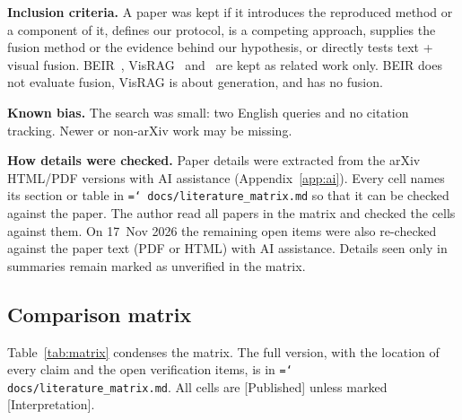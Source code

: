 \documentclass[11pt,a4paper]{article}
\newcommand{\lbl}[2]{\textsf{\scriptsize\textcolor{#1}{[#2]}}}
\newcommand{\Pub}{\lbl{tagP}{Published}}
\newcommand{\Int}{\lbl{tagI}{Interpretation}}
\newcommand{\file}[1]{\texttt{\small\hyphenchar\font=`\/ #1}}
\begin{document}
\noindent\textbf{Inclusion criteria.} A paper was kept if it introduces the reproduced method or a component of it, defines our protocol, is a competing approach, supplies the fusion method or the evidence behind our hypothesis, or directly tests text + visual fusion.
BEIR~\cite{beir}, VisRAG~\cite{visrag} and~\cite{lostocr} are kept as related work only. BEIR does not evaluate fusion, VisRAG is about generation, and \cite{lostocr} has no fusion.

\noindent\textbf{Known bias.} The search was small: two English queries and no citation tracking. Newer or non-arXiv work may be missing.

\noindent\textbf{How details were checked.} Paper details were extracted from the arXiv HTML/PDF versions with AI assistance (Appendix~\ref{app:ai}). Every cell names its section or table in \file{docs/literature\_matrix.md} so that it can be checked against the paper. The author read all papers in the matrix and checked the cells against them. On 17~Nov 2026 the remaining open items were also re-checked against the paper text (PDF or HTML) with AI assistance. Details seen only in summaries remain marked as unverified in the matrix.

\subsection{Comparison matrix}
Table~\ref{tab:matrix} condenses the matrix. The full version, with the location of every claim and the open verification items, is in \file{docs/literature\_matrix.md}. All cells are \Pub{} unless marked \Int{}.
\end{document}
